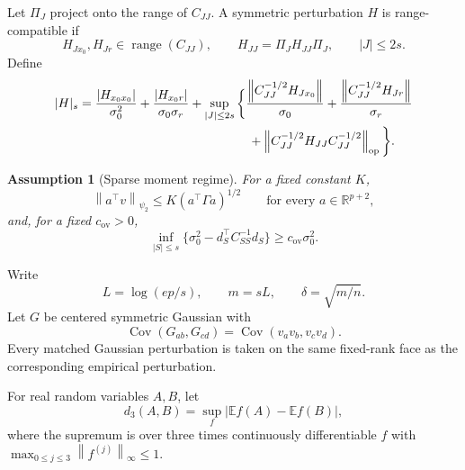 \documentclass[a4paper,11pt,english]{article}
\newtheorem{assumption}[theorem]{Assumption}
\newcommand{\E}{\mathbb E}
\newcommand{\Cov}{\operatorname{Cov}}
\newcommand{\norm}[1]{\left\lVert #1\right\rVert}
\newcommand{\R}{\mathbb R}
\begin{document}
Let $\Pi_J$ project onto the range of $C_{JJ}$.  A symmetric perturbation
$H$ is range-compatible if
\begin{equation}\label{eq:range-compatible}
        H_{Jx_0},H_{Jr}\in\operatorname{range}(C_{JJ}),
        \qquad H_{JJ}=\Pi_JH_{JJ}\Pi_J,
        \qquad |J|\le2s.
\end{equation}
Define
\begin{equation}\label{eq:sparse-moment-size}
\begin{split}
        \lvert H\rvert_s
        ={}&\frac{|H_{x_0x_0}|}{\sigma_0^2}
        +\frac{|H_{x_0r}|}{\sigma_0\sigma_r}
        +\sup_{|J|\le2s}\bigg\{
        \frac{\norm{C_{JJ}^{-1/2}H_{Jx_0}}}{\sigma_0}
        +\frac{\norm{C_{JJ}^{-1/2}H_{Jr}}}{\sigma_r}\\
        &\hspace{43mm}
        +\norm{C_{JJ}^{-1/2}H_{JJ}C_{JJ}^{-1/2}}_{\mathrm{op}}
        \bigg\}.
\end{split}
\end{equation}

\begin{assumption}[Sparse moment regime]\label{ass:sparse-moments}
For a fixed constant $K$,
\[
        \norm{a^\top v}_{\psi_2}
        \le K(a^\top\Gamma a)^{1/2}
        \qquad\text{for every }a\in\R^{p+2},
\]
and, for a fixed $c_{\mathrm{ov}}>0$,
\begin{equation}\label{eq:overlap}
        \inf_{|S|\le s}
        \{\sigma_0^2-d_S^\top C_{SS}^{-1}d_S\}
        \ge c_{\mathrm{ov}}\sigma_0^2.
\end{equation}
\end{assumption}

Write
\begin{equation}\label{eq:search-scale}
        L=\log(ep/s),
        \qquad m=sL,
        \qquad \delta=\sqrt{m/n}.
\end{equation}
Let $G$ be centered symmetric Gaussian with
\begin{equation}\label{eq:matched-moment-matrix}
        \Cov(G_{ab},G_{cd})
        =\Cov(v_av_b,v_cv_d).
\end{equation}
Every matched Gaussian perturbation is taken on the same fixed-rank face
as the corresponding empirical perturbation.

For real random variables $A,B$, let
\begin{equation}\label{eq:d3}
        d_3(A,B)=\sup_f|\E f(A)-\E f(B)|,
\end{equation}
where the supremum is over three times continuously differentiable $f$
with $\max_{0\le j\le3}\norm{f^{(j)}}_\infty\le1$.
\end{document}
